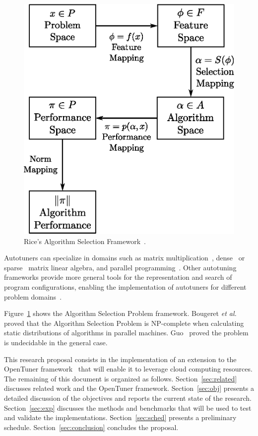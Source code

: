 \documentclass[a4paper, 12pt]{article}
\begin{document}
\begin{figure}[htpb]
    \centering
    \includegraphics[scale=.56]{algorithm-selection}
    \caption{Rice's Algorithm Selection Framework~\cite{rice1976algorithm}.}
    \label{fig:asf}
\end{figure}

Autotuners can specialize in domains such as matrix
multiplication~\cite{bilmes1997phipac}, dense~\cite{whaley1998atlas} or
sparse~\cite{vuduc2005oski} matrix linear algebra, and parallel
programming~\cite{jordan2012multi}. Other autotuning frameworks provide more
general tools for the representation and search of program configurations,
enabling the implementation of autotuners for different problem
domains~\cite{ansel2014opentuner,hutter2009paramils}.

Figure~\ref{fig:asf} shows the Algorithm Selection Problem framework.
Bougeret \emph{et al.}~\cite{bougeret2009combining} proved that the Algorithm
Selection Problem is NP-complete when calculating static distributions of
algorithms in parallel machines.  Guo~\cite{guo2003algorithm} proved the
problem is undecidable in the general case.

This research proposal consists in the implementation of an
extension to the OpenTuner framework~\cite{ansel2014opentuner} that will
enable it to leverage cloud computing resources.
The remaining of this document is organized as follows.
Section~\ref{sec:related} discusses related work and the OpenTuner
framework.
Section~\ref{sec:obj} presents a detailed discussion of the objectives
and reports the current state of the research.
Section~\ref{sec:exp} discusses the methods and benchmarks that will be used to
test and validate the implementations.
Section~\ref{sec:sched} presents a preliminary schedule.
Section~\ref{sec:conclusion} concludes the proposal.
\end{document}
